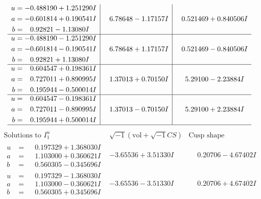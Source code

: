 \documentclass[1p]{elsarticle_modified}
\theoremstyle{definition}
\newcommand{\I}{\sqrt{-1}}
\begin{document}
$$\begin{array}{c|c|c}
\begin{aligned}
u &= -0.488190 + 1.251290 I \\
a &= -0.601814 + 0.190541 I \\
b &= \phantom{-}0.92821 - 1.13080 I\end{aligned}
 & \phantom{-}6.78648 - 1.17157 I & \phantom{-}0.521469 + 0.840506 I \\ \hline\begin{aligned}
u &= -0.488190 - 1.251290 I \\
a &= -0.601814 - 0.190541 I \\
b &= \phantom{-}0.92821 + 1.13080 I\end{aligned}
 & \phantom{-}6.78648 + 1.17157 I & \phantom{-}0.521469 - 0.840506 I \\ \hline\begin{aligned}
u &= \phantom{-}0.604547 + 0.198361 I \\
a &= \phantom{-}0.727011 + 0.890995 I \\
b &= \phantom{-}0.195944 - 0.500014 I\end{aligned}
 & \phantom{-}1.37013 + 0.70150 I & \phantom{-}5.29100 - 2.23884 I \\ \hline\begin{aligned}
u &= \phantom{-}0.604547 - 0.198361 I \\
a &= \phantom{-}0.727011 - 0.890995 I \\
b &= \phantom{-}0.195944 + 0.500014 I\end{aligned}
 & \phantom{-}1.37013 - 0.70150 I & \phantom{-}5.29100 + 2.23884 I\\
 \hline 
 \end{array}$$\newpage$$\begin{array}{c|c|c}  
\text{Solutions to }I^u_{1}& \I (\text{vol} + \sqrt{-1}CS) & \text{Cusp shape}\\
 \hline 
\begin{aligned}
u &= \phantom{-}0.197329 + 1.368030 I \\
a &= \phantom{-}1.103000 + 0.360621 I \\
b &= \phantom{-}0.560305 - 0.345696 I\end{aligned}
 & -3.65536 + 3.51330 I & \phantom{-}0.20706 - 4.67402 I \\ \hline\begin{aligned}
u &= \phantom{-}0.197329 - 1.368030 I \\
a &= \phantom{-}1.103000 - 0.360621 I \\
b &= \phantom{-}0.560305 + 0.345696 I\end{aligned}
 & -3.65536 - 3.51330 I & \phantom{-}0.20706 + 4.67402 I \\ \hline\begin{aligned}

\end{aligned}
\end{array}$$
\end{document}
